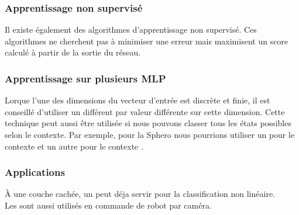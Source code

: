 \subsubsection{Apprentissage non supervisé}
Il existe également des algorithmes d'apprentissage non supervisé.
Ces algorithmes ne cherchent pas à minimiser une erreur mais maximisent un score calculé à partir de la sortie du réseau.
\subsubsection{Apprentissage sur plusieurs MLP}
Lorque l'une des dimensions du vecteur d'entrée est discrète et finie, il est conseillé d'utiliser un \mlp différent par valeur différente sur cette dimension.\cite{Gauthier}
Cette technique peut aussi être utilisée si nous pouvons classer tous les états possibles selon le contexte.
Par exemple, pour la Sphero nous pourrions utiliser un \mlp pour le contexte  et un autre \mlp pour le contexte .
\subsubsection{Applications}
À une couche cachée, un \mlp peut déja servir pour la classification non linéaire.\cite{statistica}\\
Les \mlp sont aussi utilisés en commande de robot par caméra.\cite{Pomerleau}
